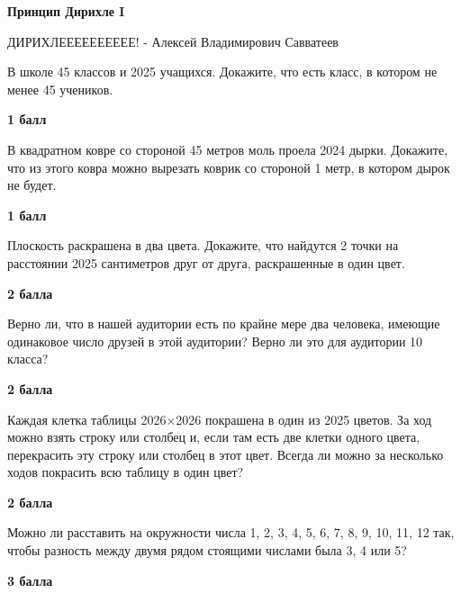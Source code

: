 \centerline{\bf \Huge Принцип Дирихле I}

\begin{flushright}
        \scriptsize{ДИРИХЛЕЕЕЕЕЕЕЕЕЕ! - Алексей Владимирович Савватеев}
\end{flushright}


 В школе 45 классов и 2025 учащихся. Докажите, что есть класс, в котором не менее 45 учеников.

\begin{flushright} \textbf{1 балл}\\ 
\end{flushright}


 В квадратном ковре со стороной 45 метров моль проела 2024 дырки. Докажите, что из этого ковра можно вырезать коврик со стороной 1 метр, в котором дырок не будет.

\begin{flushright} \textbf{1 балл}\\ 
\end{flushright}

 Плоскость раскрашена в два цвета. Докажите, что найдутся 2 точки на расстоянии 2025 сантиметров друг от друга, раскрашенные в один цвет.

\begin{flushright} \textbf{2 балла}\\ 
\end{flushright}

 Верно ли, что в нашей аудитории есть по крайне мере два человека, имеющие одинаковое число друзей в этой аудитории? Верно ли это для аудитории 10 класса?

\begin{flushright} \textbf{2 балла}\\ 
\end{flushright}

 Каждая клетка таблицы 2026×2026 покрашена в один из 2025 цветов. За ход можно взять строку или столбец и, если там есть две клетки одного цвета, перекрасить эту строку или столбец в этот цвет. Всегда ли можно за несколько ходов покрасить всю таблицу в один цвет?

\begin{flushright} \textbf{2 балла}\\ 
\end{flushright}

 Можно ли расставить на окружности числа 1, 2, 3, 4, 5, 6, 7, 8, 9, 10, 11, 12 так, чтобы разность между двумя рядом стоящими числами была 3, 4 или 5?

\begin{flushright} \textbf{3 балла}\\ 
\end{flushright}